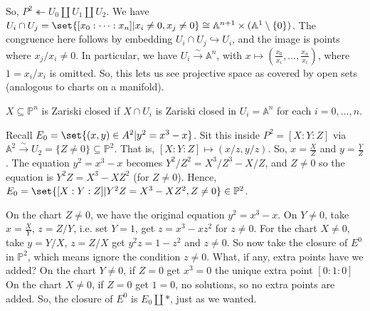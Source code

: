 \documentclass{article}
\newcommand{\A}{\mathbb{A}}
\newcommand{\proj}{\mathbb{P}}
\begin{document}



So, $P^2 \twoheadleftarrow U_0 \amalg U_1 \amalg U_2$.
We have $U_i \cap U_j = \set{[x_0:\dotsm:x_n] | x_i \neq 0, x_j \neq 0} \cong \A^{n+1} \times (\A^1 \setminus \{0\})$.
The congruence here follows by embedding $U_i \cap U_j \hookrightarrow U_i$, and the image is points where $x_j/x_i \neq 0$.
In particular, we have $U_i \xrightarrow{\sim} \A^n$, with $x \mapsto (\frac{x_0}{x_i}, \dotsc, \frac{x_n}{x_i})$, where $1=x_i/x_i$ is omitted.
So, this lets us see projective space as covered by open sets (analogous to charts on a manifold).
\begin{defi}
    $X \subseteq \proj^n$ is Zariski closed if $X \cap U_i$ is Zariski closed in $U_i=\A^n$ for each $i=0, \dotsc, n$.
\end{defi}
Recall $E_0 = \set{(x, y) \in A^2 | y^2 = x^3 - x}$. Sit this inside $P^2 = [X:Y:Z]$ via $\A^2 \xrightarrow{\sim} U_2 = \{Z \neq 0\} \subseteq \proj^2$.
That is, $[X:Y:Z] \mapsto (x/z, y/z)$.
So, $x = \frac{X}{Z}$ and $y=\frac{Y}{Z}$. The equation $y^2 = x^3 - x$ becomes $Y^2/Z^2 = X^3 / Z^3 - X/Z$, and $Z \neq 0$ so the equation is $Y^2 Z = X^3 - XZ^2$ (for $Z \neq 0$).
Hence, $E_0 = \set{[X:Y:Z] | Y^2 Z = X^3 - X Z^2, Z \neq 0} \in \proj^2$.

On the chart $Z \neq 0$, we have the original equation $y^2 = x^3 - x$.
On $Y \neq 0$, take $x = \frac{X}{Y}$, $z = Z/Y$, i.e. set $Y=1$, get $z = x^3 - xz^2$ for $z \neq 0$.
For the chart $X \neq 0$, take $y = Y/X$, $z = Z/X$ get $y^2 z = 1 - z^2$ and $z \neq 0$.
So now take the closure of $E^0$ in $\proj^2$, which means ignore the condition $z \neq 0$. What, if any, extra points have we added?
On the chart $Y \neq 0$, if $Z = 0$ get $x^3 = 0$ the unique extra point $[0:1:0]$ %
On the chart $X \neq 0$, if $Z=0$ get $1 = 0$, no solutions, so no extra points are added.
So, the closure of $E^0$ is $E_0 \amalg *$, just as we wanted.
\end{document}
